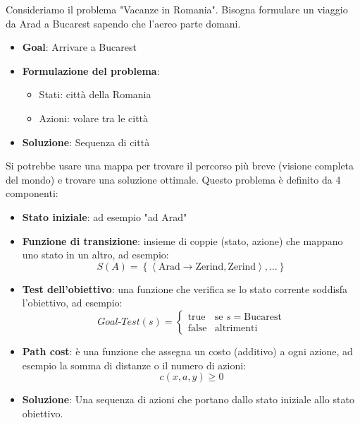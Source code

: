 \documentclass[a4paper]{article}
\begin{document}
\begin{example}
  Consideriamo il problema "Vacanze in Romania". Bisogna formulare un viaggio da Arad a
  Bucarest sapendo che l'aereo parte domani.
  \begin{itemize}
    \item \textbf{Goal}: Arrivare a Bucarest
    \item \textbf{Formulazione del problema}:
      \begin{itemize}
        \item Stati: città della Romania
        \item Azioni: volare tra le città
      \end{itemize}
    \item \textbf{Soluzione}: Sequenza di città
  \end{itemize}
  \noindent
  Si potrebbe usare una mappa per trovare il percorso più breve (visione completa del mondo)
  e trovare una soluzione ottimale.
  Questo problema è definito da 4 componenti:
  \begin{itemize}
    \item \textbf{Stato iniziale}: ad esempio "ad Arad"
    \item \textbf{Funzione di transizione}: insieme di coppie (stato, azione) che mappano
      uno stato in un altro, ad esempio:
      \[
        S(A) = \left\{ \left< \text{Arad} \to \text{Zerind}, \text{Zerind} \right>, \ldots \right\}
      \] 
    \item \textbf{Test dell'obiettivo}: una funzione che verifica se lo stato corrente
      soddisfa l'obiettivo, ad esempio:
      \[
        Goal\text{-}Test(s) = \begin{cases}
          \text{true} & \text{se } s = \text{Bucarest} \\
          \text{false} & \text{altrimenti}
        \end{cases}
      \]
    \item \textbf{Path cost}: è una funzione che assegna un costo (additivo) a ogni azione,
      ad esempio la somma di distanze o il numero di azioni:
      \[
        c(x, a, y) \ge 0
      \] 
    \item \textbf{Soluzione}: Una sequenza di azioni che portano dallo stato iniziale allo
      stato obiettivo.
  \end{itemize}
\end{example}
\end{document}
